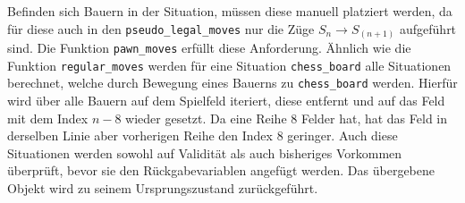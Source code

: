 \documentclass[a4paper,12pt]{article}
\begin{document}
    Befinden sich Bauern in der Situation, müssen diese manuell platziert
werden, da für diese auch in den \texttt{pseudo\_legal\_moves} nur die
Züge \(S_n \rightarrow S_{(n+1)}\) aufgeführt sind. Die Funktion
\texttt{pawn\_moves} erfüllt diese Anforderung. Ähnlich wie die Funktion
\texttt{regular\_moves} werden für eine Situation \texttt{chess\_board}
alle Situationen berechnet, welche durch Bewegung eines Bauerns zu
\texttt{chess\_board} werden. Hierfür wird über alle Bauern auf dem
Spielfeld iteriert, diese entfernt und auf das Feld mit dem Index
\(n-8\) wieder gesetzt. Da eine Reihe 8 Felder hat, hat das Feld in
derselben Linie aber vorherigen Reihe den Index 8 geringer. Auch diese
Situationen werden sowohl auf Validität als auch bisheriges Vorkommen
überprüft, bevor sie den Rückgabevariablen angefügt werden. Das
übergebene Objekt wird zu seinem Ursprungszustand zurückgeführt.
\end{document}
